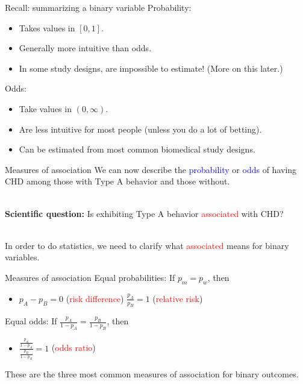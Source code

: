\documentclass{beamer}
\begin{document}
\begin{frame}{Recall: summarizing a binary variable}
Probability:
\begin{itemize}
	\item Takes values in $[0,1]$.
	\item Generally more intuitive than odds. 
	\item In some study designs, are impossible to estimate! (More on this later.)
\end{itemize}
Odds:
\begin{itemize}
	\item Take values in $(0,\infty)$.
	\item Are less intuitive for most people (unless you do a lot of betting).
	\item Can be estimated from most common biomedical study designs. 
\end{itemize}
\end{frame}

\begin{frame}{Measures of association}
	We can now describe the \textcolor{blue}{probability} or \textcolor{blue}{odds} of having CHD among those with Type A behavior and those without. 
	\\ ~\
	
	\textbf{Scientific question:} Is exhibiting Type A behavior \textcolor{red}{associated} with CHD? 
	\\ ~\
	
	In order to do statistics, we need to clarify what \textcolor{red}{associated} means for binary variables.
\end{frame}

\begin{frame}{Measures of association}
Equal probabilities: If $p_m = p_w$, then
	\begin{itemize}
		\item[] $p_A - p_B = 0$ (\textcolor{red}{risk difference}) \quad \quad \quad $\frac{p_A}{p_B} = 1$ (\textcolor{red}{relative risk})
	\end{itemize}
	\vspace{0.8cm}
Equal odds: If $\frac{p_A}{1-p_A} = \frac{p_B}{1-p_B}$, then
	\begin{itemize}
		\item[] $\frac{\frac{p_A}{1-p_A}}{\frac{p_B}{1-p_B}}=1$ (\textcolor{red}{odds ratio})
	\end{itemize}
\vspace{0.8cm}
These are the three most common measures of association for binary outcomes. 
\end{frame}
\end{document}
